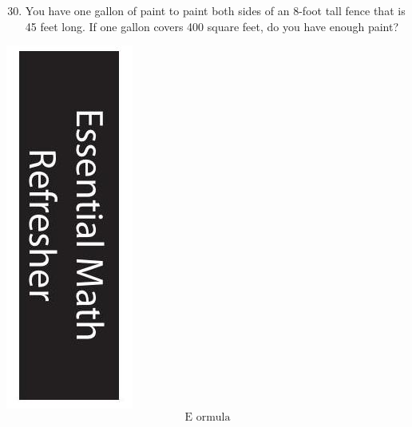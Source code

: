 \documentclass[10pt]{article}
\begin{document}
\begin{enumerate}
  \setcounter{enumi}{29}
  \item You have one gallon of paint to paint both sides of an 8-foot tall fence that is 45 feet long. If one gallon covers 400 square feet, do you have enough paint?
\end{enumerate}
\includegraphics[max width=\textwidth]{2022_09_16_4d34b76b97ee13a67df7g-25}
$$
\text { E ormula }
$$
\end{document}
